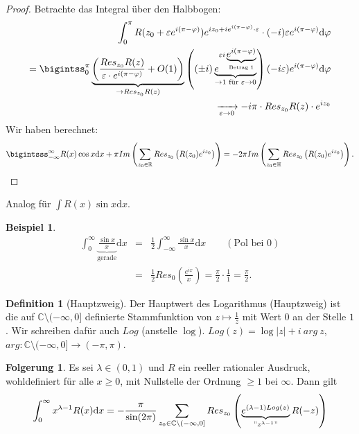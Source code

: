 \documentclass[11pt,titlepage]{article}
\theoremstyle{definition}
\newtheorem{corollary}[theorem]{Folgerung}
\newtheorem{definition}[theorem]{Definition}
\newtheorem{example}[theorem]{Beispiel}
\theoremstyle{remark}
\begin{document}
\begin{proof}
		
		Betrachte das Integral über den Halbbogen:
		\begin{eqnarray*}
			\int_0^{\pi} R(z_0+\varepsilon e^{i(\pi-\varphi)})e^{iz_0+ie^{i(\pi-\varphi)}
			\cdot\varepsilon}\cdot(-i)\varepsilon e^{i(\pi-\varphi)}\mathrm{d}\varphi \\
			= \bigintss_0^{\pi} \underbrace{\left( \frac{Res_{z_0}R(z)}{\varepsilon\cdot e^{i(\pi-\varphi)}}+ 
			O(1)\right)}_{\to Res_{z_0} R(z)}
			\left( (\pm i) \underbrace{e^{\varepsilon i\underbrace{e^{i(\pi-\varphi)}}_{\text{Betrag $1$}}}}_
			{\to 1\text{ für }\varepsilon\to 0}\right) (-i\varepsilon) e^{i(\pi-\varphi)}\mathrm{d}\varphi \\
			\xrightarrow[\varepsilon\to 0]{} -i\pi \cdot Res_{z_0}R(z)\cdot e^{iz_0}
		\end{eqnarray*}
		Wir haben berechnet:
		\[ \bigintsss_{-\infty}^{\infty} R(x)\cos x\mathrm{d}x +\pi Im\left(\sum_{z_0\in\mathbb{R}}Res_{z_0}\left(
		R(z_0)e^{iz_0}\right)\right)
		= -2\pi Im\left( \sum_{z_0\in\mathbb{H}}Res_{z_0}\left(R(z_0)e^{iz_0}\right)\right). \]
	\end{proof}
	
	Analog für $\int R(x)\sin x\mathrm{d}x$.
	
	\begin{example}
		\begin{eqnarray*}
			\int_0^{\infty} \underbrace{\frac{\sin x}{x}}_{\text{gerade}}\mathrm{d}x
			&=& \frac{1}{2} \int_{-\infty}^{\infty} \frac{\sin x}{x}\mathrm{d}x \qquad (\text{Pol bei $0$}) \\
			&=& \frac{1}{2} Res_0 \left(\frac{e^{ix}}{x}\right) = \frac{\pi}{2}\cdot \frac{1}{1} =\frac{\pi}{2}.
		\end{eqnarray*}
	\end{example}
	
	\begin{definition}[Hauptzweig]
		Der Hauptwert des Logarithmus (Hauptzweig) ist die auf $\mathbb{C}\setminus (-\infty,0]$ definierte 
		Stammfunktion von $z\mapsto \frac{1}{z}$ mit Wert $0$ an der Stelle $1$. Wir schreiben dafür 
		auch $Log$ (anstelle $\log$). $Log(z)=\log |z|+i\ arg\ z$, $arg:\mathbb{C}\setminus(-\infty,0]\to(-\pi,\pi)$.
	\end{definition}
	
	\begin{corollary}
		Es sei $\lambda\in (0,1)$ und $R$ ein reeller rationaler Ausdruck, wohldefiniert für alle $x\geq 0$, mit 
		Nullstelle der Ordnung $\geq 1$ bei $\infty$. Dann gilt 
		\[ \int_0^{\infty} x^{\lambda -1}R(x)\mathrm{d}x = -\frac{\pi}{\sin(2\pi)}\sum_{z_0\in\mathbb{C}\setminus
		(-\infty,0]}Res_{z_0} \left(\underbrace{e^{(\lambda -1)Log(z) }}_
		{\text{$"$}z^{\lambda -1}\text{$"$}}R(-z)\right) \]
	\end{corollary}
	
\end{document}
